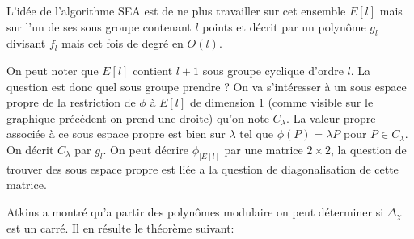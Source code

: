 \documentclass[12pt]{article}
\begin{document}

L'idée de l'algorithme SEA est de ne plus travailler sur cet ensemble $E[l]$ mais sur l'un de ses sous groupe contenant $l$ points et décrit par un polynôme $g_l$ divisant $f_l$ mais cet fois de degré en $O(l)$.
\newline
\bigskip
{}

On peut noter que $E[l]$ contient $l+1$ sous groupe cyclique d'ordre $l$.
La question est donc quel sous groupe prendre ? On va s’intéresser à un sous espace propre de la restriction de $\phi$ à $E[l]$ de dimension $1$ (comme visible sur le graphique précédent on prend une droite) qu'on note $C_{\lambda}$. La valeur propre associée à ce sous espace propre est bien sur $\lambda$ tel que $\phi(P) = \lambda P$ pour $P \in C_{\lambda}$. On décrit $C_{\lambda}$ par $g_l$.
\newline
On peut décrire $\phi_{|E[l]}$ par une matrice $2\times2$, la question de trouver des sous espace propre est liée a la question de diagonalisation de cette matrice.

Atkins a montré qu'a partir des polynômes modulaire on peut déterminer si $\Delta_{\chi}$ est un carré. Il en résulte le théorème suivant:
\end{document}
